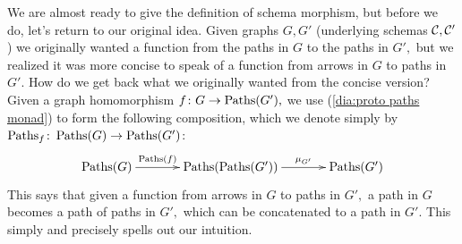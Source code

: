 \documentclass[../main/CT4S-EN-RU]{subfiles}
\begin{document}
\begin{exerciseRUS}
\end{exerciseRUS}

\begin{blockENG}
We are almost ready to give the definition of schema morphism, but before we do, let's return to our original idea. Given graphs $G,G'$ (underlying schemas $\mathcal{C},\mathcal{C}'$) we originally wanted a function from the paths in $G$ to the paths in $G',$ but we realized it was more concise to speak of a function from arrows in $G$ to paths in $G'.$ How do we get back what we originally wanted from the concise version? Given a graph homomorphism $f\colon G\rightarrow\operatorname{Paths}(G'),$ we use (\ref{dia:proto paths monad}) to form the following composition, which we denote simply by $\operatorname{Paths}_f\colon\operatorname{Paths}(G)\rightarrow\operatorname{Paths}(G')$:
\begin{align}\label{dia:kleisli comp in graph}
\xymatrix@=35pt{\Paths(G)\ar[r]^-{\Paths(f)}&\Paths(\Paths(G'))\ar[r]^-{\mu_{G'}}&\Paths(G')}
\end{align}
This says that given a function from arrows in $G$ to paths in $G',$ a path in $G$ becomes a path of paths in $G',$ which can be concatenated to a path in $G'.$ This simply and precisely spells out our intuition.
\end{blockENG}

\begin{blockRUS}
\end{blockRUS}
\end{document}
